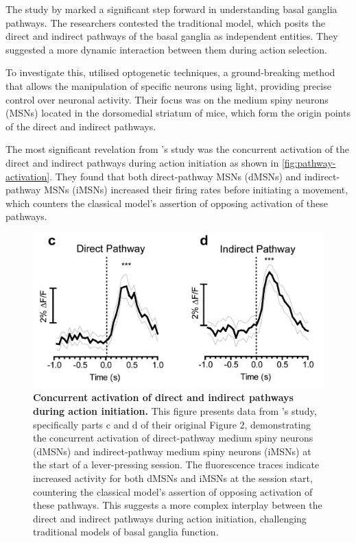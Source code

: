 \documentclass[10pt]{article}
\begin{document}
\begin{sloppypar}
  The study by \cite{cui_concurrent_2013} marked a significant step forward in understanding basal ganglia pathways. The researchers contested the traditional model, which posits the direct and indirect pathways of the basal ganglia as independent entities. They suggested a more dynamic interaction between them during action selection.

  To investigate this, \cite{cui_concurrent_2013} utilised optogenetic techniques, a ground-breaking method that allows the manipulation of specific neurons using light, providing precise control over neuronal activity. Their focus was on the medium spiny neurons (MSNs) located in the dorsomedial striatum of mice, which form the origin points of the direct and indirect pathways.

  The most significant revelation from \cite{cui_concurrent_2013} ’s study was the concurrent activation of the direct and indirect pathways during action initiation as shown in \autoref{fig:pathway-activation}. They found that both direct-pathway MSNs (dMSNs) and indirect-pathway MSNs (iMSNs) increased their firing rates before initiating a movement, which counters the classical model’s assertion of opposing activation of these pathways.

  \begin{figure}[ht]
    \centering
    \includegraphics[width=\textwidth]{figures/direct-indirect-activation.png}
    \caption[Concurrent activation of direct and indirect pathways during action initiation]{\textbf{Concurrent activation of direct and indirect pathways during action initiation.} This figure presents data from \cite{cui_concurrent_2013} ’s study, specifically parts c and d of their original Figure 2, demonstrating the concurrent activation of direct-pathway medium spiny neurons (dMSNs) and indirect-pathway medium spiny neurons (iMSNs) at the start of a lever-pressing session. The fluorescence traces indicate increased activity for both dMSNs and iMSNs at the session start, countering the classical model’s assertion of opposing activation of these pathways. This suggests a more complex interplay between the direct and indirect pathways during action initiation, challenging traditional models of basal ganglia function.}
    \label{fig:pathway-activation}
  \end{figure}


\end{sloppypar}
\end{document}
